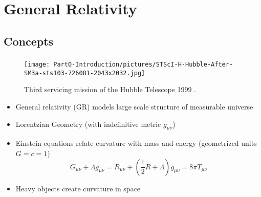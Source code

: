 \section{General Relativity}

\subsection{Concepts}
\begin{frame}
	\frametitle{\insertsubsection}
	\begin{minipage}{0.3\textwidth}
		\begin{figure}
			\centering
			\texttt{[image: Part0-Introduction/pictures/STScI-H-Hubble-After-SM3a-sts103-726081-2043x2032.jpg]}
			\vspace{0.15cm}
			\caption{Third servicing mission of the Hubble Telescope 1999 \cite{nasaHubbleSiteImageHubble1999}.}
		\end{figure}
	\end{minipage}%
	\begin{minipage}{0.7\textwidth}
		\begin{itemize}[<+->]
			\item General relativity (GR) models large scale structure of measurable universe
			\item Lorentzian Geometry (with indefinitive metric $g_{\mu\nu}$)
			\item Einstein equations relate curvature with mass and energy (geometrized units $G=c=1$)
			\[G_{\mu\nu} + \Lambda g_{\mu\nu}=R_{\mu\nu}+\left(\frac{1}{2}R+\Lambda\right)g_{\mu\nu}=8\pi T_{\mu\nu}\]
			\item Heavy objects create curvature in space
		\end{itemize}
	\end{minipage}
\end{frame}


